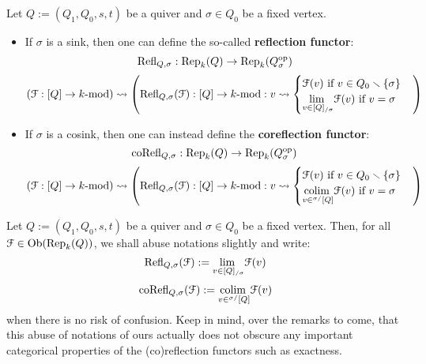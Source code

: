            \begin{definition} \label{def: (co)reflection_functors}
                Let $Q := (Q_1, Q_0, s, t)$ be a quiver and $\sigma \in Q_0$ be a fixed vertex. 
                    \begin{itemize}
                        \item If $\sigma$ is a sink, then one can define the so-called \textbf{reflection functor}:
                            $$\mathrm{Refl}_{Q, \sigma}: \mathrm{Rep}_k(Q) \to \mathrm{Rep}_k(Q_{\sigma}^{\mathrm{op}})$$
                            $$(\mathcal{F}: [Q] \to k\text{-}\mathrm{mod}) \leadsto \left( \mathrm{Refl}_{Q, \sigma}(\mathcal{F}): [Q] \to k\text{-}\mathrm{mod}: v \leadsto \begin{cases} \text{$\mathcal{F}(v)$ if $v \in Q_0 \smallsetminus \{\sigma\}$} \\ \text{$\underset{v \in [Q]_{/\sigma}}{\operatorname{lim} \:} \mathcal{F}(v)$ if $v = \sigma$} \end{cases} \right)$$
                        \item If $\sigma$ is a cosink, then one can instead define the \textbf{coreflection functor}:
                            $$\mathrm{co}\mathrm{Refl}_{Q, \sigma}: \mathrm{Rep}_k(Q) \to \mathrm{Rep}_k(Q_{\sigma}^{\mathrm{op}})$$
                            $$(\mathcal{F}: [Q] \to k\text{-}\mathrm{mod}) \leadsto \left( \mathrm{Refl}_{Q, \sigma}(\mathcal{F}): [Q] \to k\text{-}\mathrm{mod}: v \leadsto \begin{cases} \text{$\mathcal{F}(v)$ if $v \in Q_0 \smallsetminus \{\sigma\}$} \\ \text{$\underset{v \in {}^{\sigma/}[Q]}{\operatorname{colim} \:} \mathcal{F}(v)$ if $v = \sigma$} \end{cases} \right)$$
                    \end{itemize}
            \end{definition}
            \begin{convention}
                Let $Q := (Q_1, Q_0, s, t)$ be a quiver and $\sigma \in Q_0$ be a fixed vertex. Then, for all $\mathcal{F} \in \mathrm{Ob}(\mathrm{Rep}_k(Q))$, we shall abuse notations slightly and write:
                    $$\mathrm{Refl}_{Q, \sigma}(\mathcal{F}) := \underset{v \in [Q]_{/\sigma}}{\operatorname{lim} \:} \mathcal{F}(v)$$
                    $$\mathrm{co}\mathrm{Refl}_{Q, \sigma}(\mathcal{F}) := \underset{v \in {}^{\sigma/}[Q]}{\operatorname{colim} \:} \mathcal{F}(v)$$
                when there is no risk of confusion. Keep in mind, over the remarks to come, that this abuse of notations of ours actually does not obscure any important categorical properties of the (co)reflection functors such as exactness.
            \end{convention}
